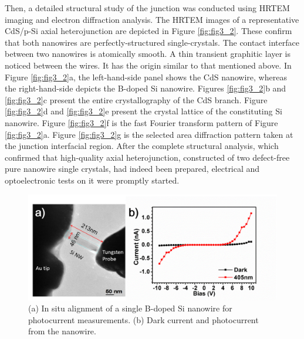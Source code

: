 Then, a detailed structural study of the junction was conducted using HRTEM imaging and electron diffraction analysis. The HRTEM images of a representative CdS/p-Si axial heterojunction are depicted in Figure \ref{fig:fig3_2}. These confirm that both nanowires are perfectly-structured single-crystals. The contact interface between two nanowires is atomically smooth. A thin transient graphitic layer is noticed between the wires. It has the origin similar to that mentioned above. In Figure \ref{fig:fig3_2}a, the left-hand-side panel shows the CdS nanowire, whereas the right-hand-side depicts the B-doped Si nanowire. Figures \ref{fig:fig3_2}b and \ref{fig:fig3_2}c present the entire crystallography of the CdS branch. Figure \ref{fig:fig3_2}d and \ref{fig:fig3_2}e present the crystal lattice of the constituting Si nanowire. Figure \ref{fig:fig3_2}f is the fast Fourier transform pattern of Figure \ref{fig:fig3_2}a. Figure \ref{fig:fig3_2}g is the selected area diffraction pattern taken at the junction interfacial region. After the complete structural analysis, which confirmed that high-quality axial heterojunction, constructed of two defect-free pure nanowire single crystals, had indeed been prepared, electrical and optoelectronic tests on it were promptly started. 

\begin{figure}  
\includegraphics[width=\textwidth]{figures/figure3_s2}
\caption[TEM and currents of a Si NW]{(a) In situ alignment of a single B-doped Si nanowire for photocurrent measurements. (b) Dark current and photocurrent from the nanowire. 
\label{fig:fig3_s2}}
\end{figure}

